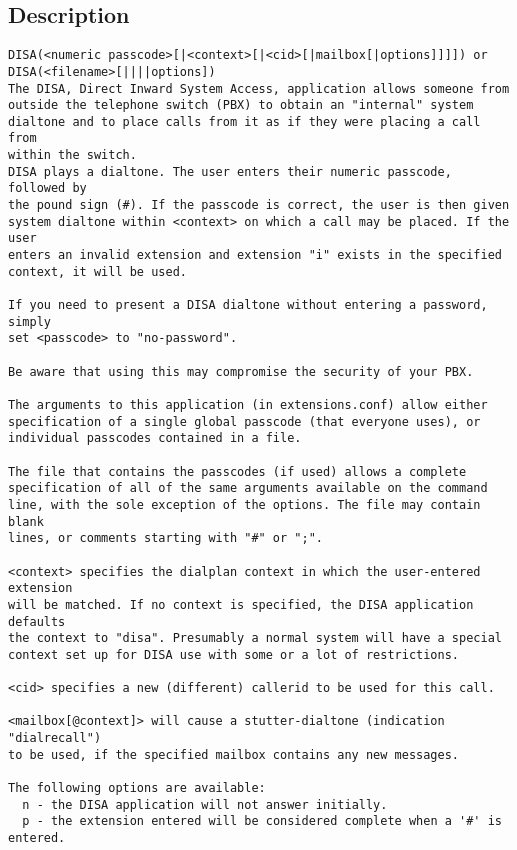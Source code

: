 \subsection{Description}
\begin{verbatim}
DISA(<numeric passcode>[|<context>[|<cid>[|mailbox[|options]]]]) or
DISA(<filename>[||||options])
The DISA, Direct Inward System Access, application allows someone from 
outside the telephone switch (PBX) to obtain an "internal" system 
dialtone and to place calls from it as if they were placing a call from 
within the switch.
DISA plays a dialtone. The user enters their numeric passcode, followed by
the pound sign (#). If the passcode is correct, the user is then given
system dialtone within <context> on which a call may be placed. If the user
enters an invalid extension and extension "i" exists in the specified
context, it will be used.

If you need to present a DISA dialtone without entering a password, simply
set <passcode> to "no-password".

Be aware that using this may compromise the security of your PBX.

The arguments to this application (in extensions.conf) allow either
specification of a single global passcode (that everyone uses), or
individual passcodes contained in a file.

The file that contains the passcodes (if used) allows a complete
specification of all of the same arguments available on the command
line, with the sole exception of the options. The file may contain blank
lines, or comments starting with "#" or ";".

<context> specifies the dialplan context in which the user-entered extension
will be matched. If no context is specified, the DISA application defaults
the context to "disa". Presumably a normal system will have a special
context set up for DISA use with some or a lot of restrictions.

<cid> specifies a new (different) callerid to be used for this call.

<mailbox[@context]> will cause a stutter-dialtone (indication "dialrecall")
to be used, if the specified mailbox contains any new messages.

The following options are available:
  n - the DISA application will not answer initially.
  p - the extension entered will be considered complete when a '#' is entered.

\end{verbatim}


